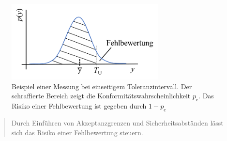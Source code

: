 \begin{figure}[!htp]
	\begin{center}
		\includegraphics[width=80mm]{05_vorlesung/media/Fehlbewertung.png}
		\caption{\label{fig:Produktion_Widerstaende} Beispiel einer Messung bei einseitigem Toleranzintervall. Der schraffierte Bereich zeigt die Konformitätswahrscheinlichkeit $p_\mathrm{c}$. Das Risiko einer Fehlbewertung ist gegeben durch $1- p_\mathrm{c}$}
	\end{center}
\end{figure}

\begin{quote}
Durch Einführen von Akzeptanzgrenzen und Sicherheitsabständen lässt sich das Risiko einer Fehlbewertung steuern.
\end{quote}

